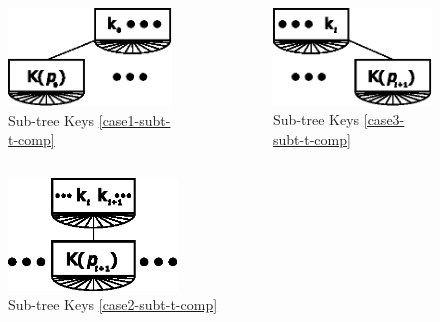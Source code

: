 \documentclass{beamer}
\begin{document}
\begin{frame}
    \begin{columns}
        \begin{column}{0.5\textwidth}
            \begin{figure}
                \centering
                \includegraphics[width=0.75\linewidth,keepaspectratio]{resources/made/keys_comp_case1.eps}
                \caption{Sub-tree Keys \eqref{case1-subt-t-comp}}
            \end{figure}
        \end{column}
        \begin{column}{0.5\textwidth}
            \begin{figure}
                \centering
                \includegraphics[width=0.75\linewidth,keepaspectratio]{resources/made/keys_comp_case3.eps}
                \caption{Sub-tree Keys \eqref{case3-subt-t-comp}}
            \end{figure}
        \end{column}
    \end{columns}
    \begin{figure}
        \centering
        \includegraphics[width=0.4\textwidth,keepaspectratio]{resources/made/keys_comp_case2.eps}
        \caption{Sub-tree Keys \eqref{case2-subt-t-comp}}
    \end{figure}
\end{frame}
\end{document}
